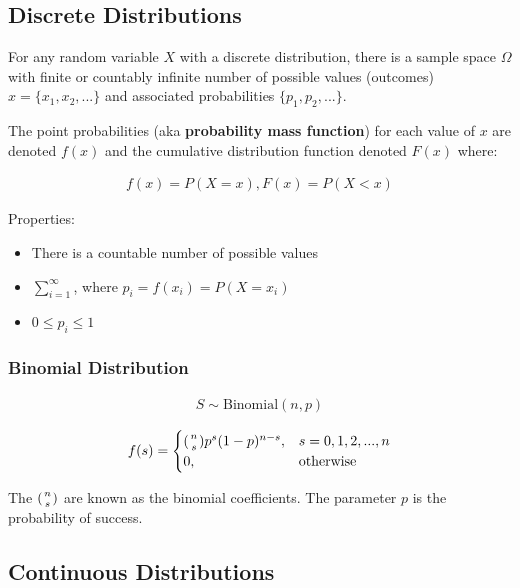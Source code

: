 \subsection{Discrete Distributions}

\indent

For any random variable $X$ with a discrete distribution, there is a sample space $\Omega$ with finite or countably infinite number of possible values (outcomes) $x = \{x_1,x_2,...\}$ and associated probabilities $\{p_1,p_2,...\}$.

The point probabilities (aka \textbf{probability mass function}) for each value of $x$ are denoted $f(x)$ and the cumulative distribution function denoted $F(x)$ where:

\begin{align*}
    f(x)=P(X=x),F(x) = P(X<x)
\end{align*}

Properties:

\begin{itemize}
    \item There is a countable number of possible values
    \item $\sum_{i=1}^{\infty}$, where $p_i = f(x_i)=P(X=x_i)$
    \item $0\leq p_i \leq 1$
\end{itemize}

\subsubsection{Binomial Distribution}

\begin{align*}
    S\sim \text{Binomial}(n,p)
\end{align*}

\begin{align*}
    f(s) = 
    \begin{cases}
        (\genfrac{}{}{0pt}{}{n}{s})p^s(1-p)^{n-s},& s=0,1,2,...,n\\
        0,& \text{otherwise}
    \end{cases}
\end{align*}

The $(\genfrac{}{}{0pt}{}{n}{s})$ are known as the binomial coefficients. The parameter $p$ is the probability of success.

\subsection{Continuous Distributions}

